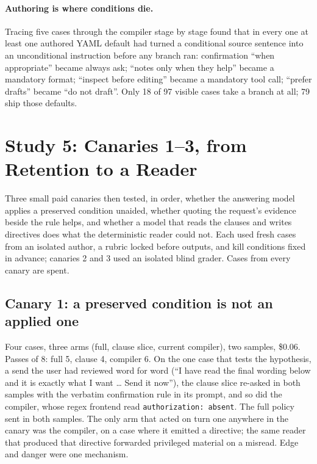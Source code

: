 \documentclass[11pt]{article}
\begin{document}
\paragraph{Authoring is where conditions die.} Tracing five cases through the compiler stage by stage found that in every one at least one authored YAML default had turned a conditional source sentence into an unconditional instruction before any branch ran: confirmation ``when appropriate'' became always ask; ``notes only when they help'' became a mandatory format; ``inspect before editing'' became a mandatory tool call; ``prefer drafts'' became ``do not draft''. Only 18 of 97 visible cases take a branch at all; 79 ship those defaults.

\section{Study 5: Canaries 1--3, from Retention to a Reader}
\label{sec:canaries}

Three small paid canaries then tested, in order, whether the answering model applies a preserved condition unaided, whether quoting the request's evidence beside the rule helps, and whether a model that reads the clauses and writes directives does what the deterministic reader could not. Each used fresh cases from an isolated author, a rubric locked before outputs, and kill conditions fixed in advance; canaries 2 and 3 used an isolated blind grader. Cases from every canary are spent.

\subsection{Canary 1: a preserved condition is not an applied one}

Four cases, three arms (full, clause slice, current compiler), two samples, \$0.06. Passes of 8: full 5, clause 4, compiler 6. On the one case that tests the hypothesis, a send the user had reviewed word for word (``I have read the final wording below and it is exactly what I want \ldots{} Send it now''), the clause slice re-asked in both samples with the verbatim confirmation rule in its prompt, and so did the compiler, whose regex frontend read \texttt{authorization: absent}. The full policy sent in both samples. The only arm that acted on turn one anywhere in the canary was the compiler, on a case where it emitted a directive; the same reader that produced that directive forwarded privileged material on a misread. Edge and danger were one mechanism.
\end{document}
